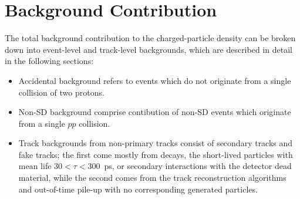 \section{Background Contribution}\label{section:star_background}
The total background contribution to the charged-particle density can be broken down into
event-level and track-level backgrounds, which are described in detail in the following sections:
\begin{itemize}
	\item Accidental background refers to events which do not originate from a single collision of two protons.
	\item Non-SD background comprise contibution of non-SD events which originate from a single $pp$ collision.
	\item Track backgrounds from non-primary tracks consist of secondary tracks and fake tracks; the first come mostly from decays, the short-lived particles with mean life $30 < \tau < 300$~ps, or secondary interactions with the detector dead material, while the second comes from the track reconstruction algorithms and out-of-time pile-up with
	no corresponding generated particles.
\end{itemize}


